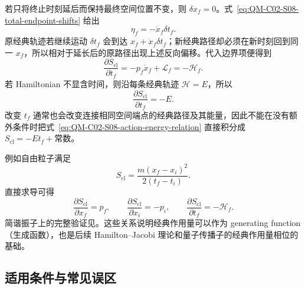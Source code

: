 若只将终止时刻延后而保持最终空间位置不变，则 $\delta x_f=0$。式~\eqref{eq:QM-C02-S08-total-endpoint-shifts} 给出
\begin{equation}
  \eta_f=-\dot x_f\delta t_f.
  \label{eq:QM-C02-S08-fixed-position-eta}
\end{equation}
原经典轨迹若继续运动 $\delta t_f$ 会到达 $x_f+\dot x_f\delta t_f$；新经典路径却必须在新时刻回到同一 $x_f$，所以相对于延长后的原路径出现上述反向偏移。代入边界项便得到
\begin{equation}
  \frac{\partial S_{\mathrm{cl}}}{\partial t_f}
  =-p_f\dot x_f+\mathcal L_f
  =-\mathcal H_f.
  \label{eq:QM-C02-S08-action-time-derivative}
\end{equation}
若 Hamiltonian 不显含时间，则沿每条经典轨迹 $\mathcal H=E$，所以
\begin{equation}
  \boxed{
  \frac{\partial S_{\mathrm{cl}}}{\partial t_f}=-E.}
  \label{eq:QM-C02-S08-action-energy-relation}
\end{equation}
改变 $t_f$ 通常也会改变连接相同空间端点的经典路径及其能量，因此不能在没有额外条件时把式~\eqref{eq:QM-C02-S08-action-energy-relation} 直接积分成 $S_{\mathrm{cl}}=-Et_f+\text{常数}$。

例如自由粒子满足
\begin{equation}
  S_{\mathrm{cl}}
  =\frac{m(x_f-x_i)^2}{2(t_f-t_i)}.
  \label{eq:QM-C02-S08-free-action}
\end{equation}
直接求导可得
\[
  \frac{\partial S_{\mathrm{cl}}}{\partial x_f}=p_f,
  \qquad
  \frac{\partial S_{\mathrm{cl}}}{\partial x_i}=-p_i,
  \qquad
  \frac{\partial S_{\mathrm{cl}}}{\partial t_f}=-\mathcal H_f.
\]
简谐振子上的完整验证见。这些关系说明经典作用量可以作为 generating function（生成函数），也是后续 Hamilton--Jacobi 理论和量子传播子的经典作用量相位的基础。

\subsection{适用条件与常见误区}

